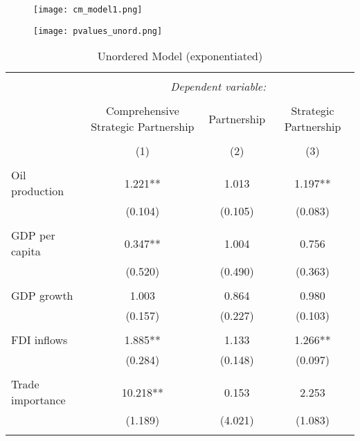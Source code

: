 \documentclass[12pt,letterpaper]{article}
\begin{document}
\newpage
 

\begin{figure}[H]
    \centering
    \texttt{[image: cm\_model1.png]}
\end{figure}

 

\begin{figure}[H]
    \centering
    \texttt{[image: pvalues\_unord.png]}
\end{figure}

 

\begin{table}[H] 
\centering 
\caption{Unordered Model (exponentiated)} 
\label{} 
\begin{tabular}{@{\extracolsep{5pt}}lccc} 
\\[-1.8ex]\hline 
\hline \\[-1.8ex] 
 & \multicolumn{3}{c}{\textit{Dependent variable:}} \\ 
\cline{2-4} 
\\[-1.8ex] & Comprehensive Strategic Partnership & Partnership & Strategic Partnership \\ 
\\[-1.8ex] & (1) & (2) & (3)\\ 
\hline \\[-1.8ex] 
 Oil production & 1.221** & 1.013 & 1.197** \\ 
  & (0.104) & (0.105) & (0.083) \\ 
  & & & \\ 
 GDP per capita & 0.347** & 1.004 & 0.756 \\ 
  & (0.520) & (0.490) & (0.363) \\ 
  & & & \\ 
 GDP growth & 1.003 & 0.864 & 0.980 \\ 
  & (0.157) & (0.227) & (0.103) \\ 
  & & & \\ 
 FDI inflows & 1.885** & 1.133 & 1.266** \\ 
  & (0.284) & (0.148) & (0.097) \\ 
  & & & \\ 
 Trade importance & 10.218** & 0.153 & 2.253 \\ 
  & (1.189) & (4.021) & (1.083) \\ 
  & & & \\ 

\end{tabular}
\end{table}
\end{document}
